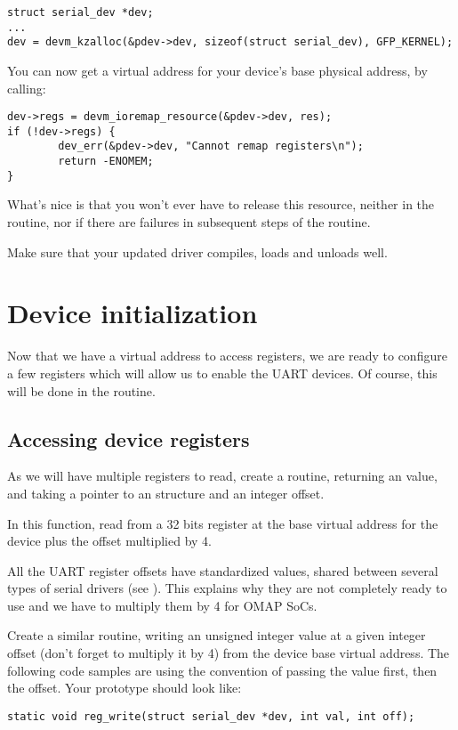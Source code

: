 \begin{verbatim}
struct serial_dev *dev;
...
dev = devm_kzalloc(&pdev->dev, sizeof(struct serial_dev), GFP_KERNEL);
\end{verbatim}

You can now get a virtual address for your device's base physical
address, by calling:

\begin{verbatim}
dev->regs = devm_ioremap_resource(&pdev->dev, res);
if (!dev->regs) {
        dev_err(&pdev->dev, "Cannot remap registers\n");
        return -ENOMEM;
}
\end{verbatim}

What's nice is that you won't ever have to release this resource,
neither in the  routine, nor if there are failures
in subsequent steps of the  routine.

Make sure that your updated driver compiles, loads and unloads well.

\section{Device initialization}

Now that we have a virtual address to access registers, we are ready to
configure a few registers which will allow us to enable the UART
devices. Of course, this will be done in the  routine.

\subsection{Accessing device registers}

As we will have multiple registers to read, create a 
routine, returning an  value, and  taking a 
pointer to an  structure and an  integer
offset.

In this function, read from a 32 bits register at the base virtual
address for the device plus the offset multiplied by 4.

All the UART register offsets have standardized values, shared between
several types of serial drivers (see
). This explains why they are not
completely ready to use and we have to multiply them by 4 for OMAP SoCs.

Create a similar  routine, writing an unsigned integer
value at a given integer offset (don't forget to multiply it by 4) from
the device base virtual address. The following code samples are using
the  convention of passing the value first, then the
offset. Your prototype should look like:
\begin{verbatim}
static void reg_write(struct serial_dev *dev, int val, int off);
\end{verbatim}

